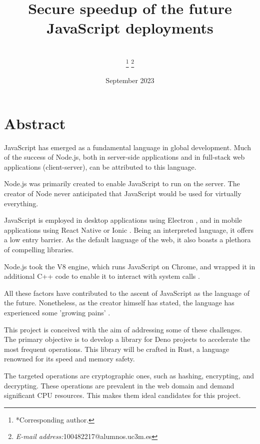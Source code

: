 \documentclass[10pt,journal,compsoc]{IEEEtran}
\begin{document}
\title{Secure speedup of the future JavaScript deployments}
\author{\\
    \thanks{*Corresponding author.}%
    \thanks{\textit{E-mail address:}100482217@alumnos.uc3m.es}}

\date{September 2023}
\maketitle
\section{Abstract}
JavaScript has emerged as a fundamental language in global development. Much of the success of Node.js, both in server-side applications and in full-stack web applications (client-server), can be attributed to this language.

Node.js was primarily created to enable JavaScript to run on the server. The creator of Node never anticipated that JavaScript would be used for virtually everything.

JavaScript is employed in desktop applications using Electron \cite{ELECTRON}, and in mobile applications using React Native \cite{RN} or Ionic \cite{IONIC}. Being an interpreted language, it offers a low entry barrier. As the default language of the web, it also boasts a plethora of compelling libraries.

Node.js took the V8 engine, which runs JavaScript on Chrome, and wrapped it in additional C++ code to enable it to interact with system calls \cite{FKNODE}.

All these factors have contributed to the ascent of JavaScript as the language of the future. Nonetheless, as the creator himself has stated, the language has experienced some 'growing pains' \cite{FKNODE}.

This project is conceived with the aim of addressing some of these challenges. The primary objective is to develop a library for Deno projects to accelerate the most frequent operations. This library will be crafted in Rust, a language renowned for its speed and memory safety.

The targeted operations are cryptographic ones, such as hashing, encrypting, and decrypting. These operations are prevalent in the web domain and demand significant CPU resources. This makes them ideal candidates for this project.
\end{document}

